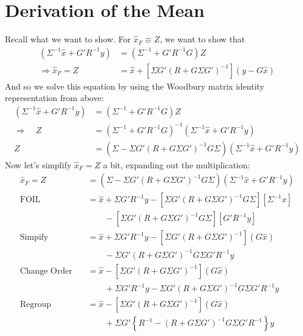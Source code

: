 \documentclass[a4paper,12pt]{article}
\begin{document}
\section{Derivation of the Mean}

Recall what we want to show.  For $\hat{x}_F \equiv Z$, we want
to show that
\begin{align*}
    (\Sigma^{-1} \hat{x} + G'R^{-1}y) 
	&= \left( \Sigma^{-1} + G'R^{-1}G\right) Z \\
    \Rightarrow 
    \hat{x}_F = Z 
        &= \hat{x} 
        + \left[\Sigma G' (R + G \Sigma G')^{-1}  \right]
        \left( y - G \hat{x} \right)  
\end{align*}
And so we solve this equation by using the Woodbury matrix
identity representation from above:
\begin{align*}
    (\Sigma^{-1} \hat{x} + G'R^{-1}y) &= 
	\left( \Sigma^{-1} + G'R^{-1}G\right) Z \\
    \Rightarrow \quad Z &=
	\left( \Sigma^{-1} + G'R^{-1}G\right)^{-1} 
	(\Sigma^{-1} \hat{x} + G'R^{-1}y) \\
    Z &= 
	\left( \Sigma - \Sigma G'(R 
	+ G\Sigma G')^{-1}
	G\Sigma\right) \left(\Sigma^{-1} \hat{x} 
	+ G'R^{-1}y\right)
\end{align*}
Now let's simplify $\hat{x}_F = Z$ a bit, 
expanding out the multiplication:
\begin{align*}
    \hat{x}_F = Z &= 
	\left( \Sigma - \Sigma G'(R 
	+ G\Sigma G')^{-1}
	G\Sigma\right) \left(\Sigma^{-1} \hat{x} 
	+ G'R^{-1}y\right) \\
    \text{FOIL} \quad &= \hat{x} + \Sigma G' R^{-1} y - 
	\left[\Sigma G' (R + G \Sigma G')^{-1} G \Sigma\right]
	\left[ \Sigma^{-1} \hat{x} \right]  \\
    &\qquad - \left[\Sigma G' (R+ G \Sigma G')^{-1}G\Sigma \right]
	\left[G' R^{-1} y \right] \\
    \text{Simpify} \quad &= \hat{x} + \Sigma G' R^{-1} y - 
	\left[\Sigma G' (R + G \Sigma G')^{-1}  \right]
	\left( G \hat{x} \right)  \\
    &\qquad - \Sigma G' (R+ G \Sigma G')^{-1}G\Sigma 
	G' R^{-1} y  \\
    \text{Change Order} \quad &= \hat{x} 
	- \left[\Sigma G' (R + G \Sigma G')^{-1}  \right]
	\left( G \hat{x} \right)  \\
    &\qquad 
	+ \Sigma G'  R^{-1} y 
	- \Sigma G' (R+ G \Sigma G')^{-1}G\Sigma  
	G' R^{-1} y \\
    \text{Regroup} \quad &= \hat{x} 
	- \left[\Sigma G' (R + G \Sigma G')^{-1}  \right]
	\left( G \hat{x} \right)  \\
    &\qquad 
	+ \Sigma G'  \left\{ R^{-1}  
	-  (R+ G \Sigma G')^{-1}G\Sigma  
	G' R^{-1} \right\} y 
\end{align*}
\end{document}
